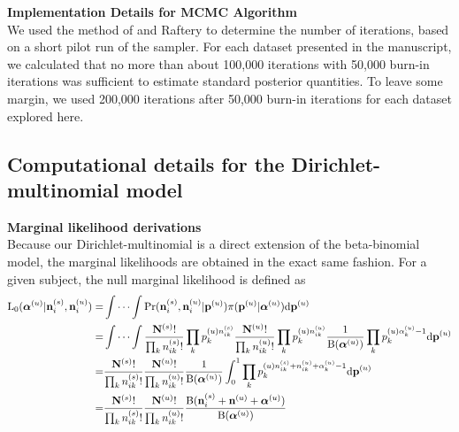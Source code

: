 \documentclass{article}
\begin{document}
\noindent\textbf{Implementation Details for MCMC Algorithm}\\
We used the method of \cite{Raftery:1992vp} and Raftery \citep{Walter1996} to determine
the number of iterations, based on a short pilot run of the
sampler. For each dataset presented in the manuscript, we calculated that no more
than about 100,000 iterations with 50,000 burn-in iterations was sufficient to estimate standard posterior quantities. To leave some margin, we used 200,000 iterations after 50,000 burn-in iterations for each dataset explored here.

\subsection{Computational details for the Dirichlet-multinomial model}
\noindent\textbf{Marginal likelihood derivations}\\
Because our Dirichlet-multinomial is a direct extension of the beta-binomial model, the marginal likelihoods are obtained in the exact same fashion.
For a given subject, the null marginal likelihood is defined as
\[
\begin{split}
\mathrm{L_0}(\boldsymbol{\alpha}^{(u)}|\mathbf{n}^{(s)}_{i},\mathbf{n}^{(u)}_{i})=&\idotsint\mathrm{Pr}(\mathbf{n}^{(s)}_{i},\mathbf{n}^{(u)}_{i}|\mathbf{p}^{(u)})\pi(\mathbf{p}^{(u)}|\boldsymbol{\alpha}^{(u)})\mathrm{d}\mathbf{p}^{(u)}\\
=&\idotsint \frac{\mathbf{N}^{(s)}!}{\prod_k {n}^{(s)}_{ik}!}\prod_k p^{(u)n^{(s)}_{ik}}_{k} \frac{\mathbf{N}^{(u)}!}{\prod_k {n}^{(u)}_{ik}!}\prod_k p^{(u)n^{(u)}_{ik}}_{k}\frac{1}{\mathrm{B}(\boldsymbol{\alpha}^{(u)})}\prod_k p^{(u)\alpha^{(u)}_{k}-1}_{k}\mathrm{d}\mathbf{p}^{(u)}\\
=&\frac{\mathbf{N}^{(s)}!}{\prod_k {n}^{(s)}_{ik}!}\frac{\mathbf{N}^{(u)}!}{\prod_k {n}^{(u)}_{ik}!}\frac{1}{\mathrm{B}(\boldsymbol{\alpha}^{(u)})}\int_0^1 \prod_k p^{(u)n^{(s)}_{ik}+n^{(u)}_{ik}+\alpha^{(u)}_{k}-1}_{k}\mathrm{d}\mathbf{p}^{(u)}\\
=&\frac{\mathbf{N}^{(s)}!}{\prod_k {n}^{(s)}_{ik}!}\frac{\mathbf{N}^{(u)}!}{\prod_k {n}^{(u)}_{ik}!}\frac{\mathrm{B}(\mathbf{n}^{(s)}_{i}+\mathbf{n}^{(u)}+\boldsymbol{\alpha}^{(u)})}{\mathrm{B}(\boldsymbol{\alpha}^{(u)})}
\end{split}
\]
\end{document}
